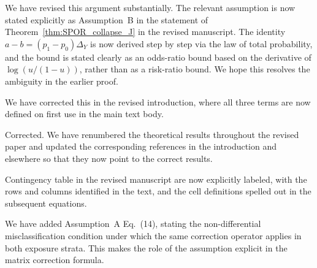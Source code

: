 \documentclass[onecolumn,11pt]{IEEEtran}
\begin{document}
We have revised this argument substantially. The relevant assumption is now stated explicitly as Assumption~B in the statement of  Theorem~\ref{thm:SPOR_collapse_J} in the revised manuscript. The identity $a-b=(p_1-p_0)\Delta_Y$ is now derived step by step via the law of total probability, and the bound is stated clearly as an odds-ratio bound based on the derivative of $\log(u/(1-u))$, rather than as a risk-ratio bound. We hope this resolves the ambiguity in the earlier proof.


We have corrected this in the revised introduction, where all three terms are now defined on first use in the main text body.





Corrected. We have renumbered the theoretical results throughout the revised paper and updated the corresponding references in the introduction and elsewhere so that they now point to the correct results.




Contingency table in the revised manuscript are now explicitly labeled, with the rows and columns identified in the text, and the cell definitions spelled out in the subsequent equations.




We have added Assumption~A  Eq.~(14), stating the non-differential misclassification condition under which the same correction operator applies in both exposure strata. This makes the role of the assumption explicit in the matrix correction formula.
\end{document}
